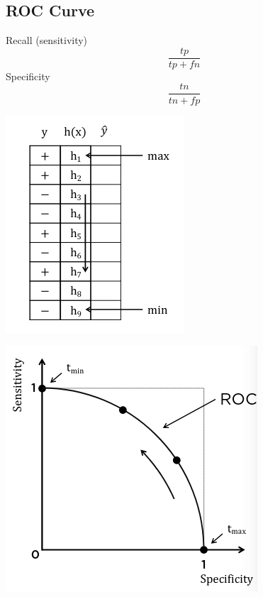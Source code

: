 \documentclass{article}[18pt]
\begin{document}
\subsection{ROC Curve}
Recall (sensitivity)
$$\dfrac{tp}{tp+fn}$$
Specificity
$$\dfrac{tn}{tn+fp}$$
\begin{center}
	\includegraphics[scale=0.7]{ROC}
\end{center}
\begin{center}
	\includegraphics[scale=0.7]{ROC1}
\end{center}
\end{document}
